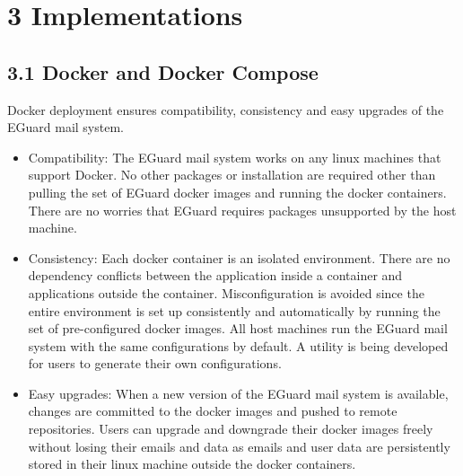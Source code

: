 \documentclass[11pt]{article}
\begin{document}
\section*{\large{3 \hspace{10pt} Implementations}}

\subsection*{3.1 \hspace{10pt} Docker and Docker Compose}
Docker deployment ensures compatibility, consistency and easy upgrades of the EGuard mail system.
\begin{itemize}

\item Compatibility: The EGuard mail system works on any linux machines that support Docker. No other packages or installation are required other than pulling the set of EGuard docker images and running the docker containers. There are no worries that EGuard requires packages unsupported by the host machine.

\item Consistency: Each docker container is an isolated environment. There are no dependency conflicts between the application inside a container and applications outside the container. Misconfiguration is avoided since the entire environment is set up consistently and automatically by running the set of pre-configured docker images. All host machines run the EGuard mail system with the same configurations by default. A utility is being developed for users to generate their own configurations.

\item Easy upgrades: When a new version of the EGuard mail system is available, changes are committed to the docker images and pushed to remote repositories. Users can upgrade and downgrade their docker images freely without losing their emails and data as emails and user data are persistently stored in their linux machine outside the docker containers.

\end{itemize}

\end{document}
